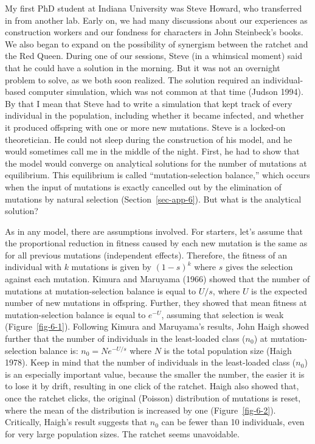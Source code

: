 \documentclass[
  letterpaper,
]{book}
\begin{document}
My first PhD student at Indiana University was Steve Howard, who
transferred in from another lab. Early on, we had many discussions about
our experiences as construction workers and our fondness for characters
in John Steinbeck's books. We also began to expand on the possibility of
synergism between the ratchet and the Red Queen. During one of our
sessions, Steve (in a whimsical moment) said that he could have a
solution in the morning. But it was not an overnight problem to solve,
as we both soon realized. The solution required an individual-based
computer simulation, which was not common at that time (Judson 1994). By
that I mean that Steve had to write a simulation that kept track of
every individual in the population, including whether it became
infected, and whether it produced offspring with one or more new
mutations. Steve is a locked-on theoretician. He could not sleep during
the construction of his model, and he would sometimes call me in the
middle of the night. First, he had to show that the model would converge
on analytical solutions for the number of mutations at equilibrium. This
equilibrium is called ``mutation-selection balance,'' which occurs when
the input of mutations is exactly cancelled out by the elimination of
mutations by natural selection (Section~\ref{sec-app-6}). But what is
the analytical solution?

As in any model, there are assumptions involved. For starters, let's
assume that the proportional reduction in fitness caused by each new
mutation is the same as for all previous mutations (independent
effects). Therefore, the fitness of an individual with \(k\) mutations
is given by \((1-s)^k\) where \(s\) gives the selection against each
mutation. Kimura and Maruyama (1966) showed that the number of mutations
at mutation-selection balance is equal to \(U/s\), where \(U\) is the
expected number of new mutations in offspring. Further, they showed that
mean fitness at mutation-selection balance is equal to \(e^{-U}\),
assuming that selection is weak (Figure~\ref{fig-6-1}). Following Kimura
and Maruyama's results, John Haigh showed further that the number of
individuals in the least-loaded class (\(n_0\)) at mutation-selection
balance is: \(n_0=Ne^{-U/s}\) where \(N\) is the total population size
(Haigh 1978). Keep in mind that the number of individuals in the
least-loaded class (\(n_0\)) is an especially important value, because
the smaller the number, the easier it is to lose it by drift, resulting
in one click of the ratchet. Haigh also showed that, once the ratchet
clicks, the original (Poisson) distribution of mutations is reset, where
the mean of the distribution is increased by one (Figure~\ref{fig-6-2}).
Critically, Haigh's result suggests that \(n_0\) can be fewer than 10
individuals, even for very large population sizes. The ratchet seems
unavoidable.
\end{document}

